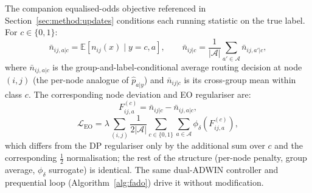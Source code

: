 \documentclass[sigconf,anonymous,review]{acmart}
\begin{document}
The companion equalised-odds objective referenced in Section~\ref{sec:method:updates} conditions each running statistic on the true label. For $c \in \{0,1\}$:
\[
\bar{n}_{ij,a|c} = \mathbb{E}[n_{ij}(x) \mid y=c, a], \qquad
\bar{n}_{ij|c} = \frac{1}{|\mathcal{A}|}\sum_{a' \in \mathcal{A}} \bar{n}_{ij,a'|c},
\]
where $\bar{n}_{ij,a|c}$ is the group-and-label-conditional average routing decision at node $(i,j)$ (the per-node analogue of $\hat{p}_{a|y}$) and $\bar{n}_{ij|c}$ is its
cross-group mean within class $c$. The corresponding node deviation and EO regulariser are:
\[
F_{ij,a}^{(c)} = \bar{n}_{ij|c} - \bar{n}_{ij,a|c},
\]
\[
\mathcal{L}_{\text{EO}} = \lambda \sum_{(i,j)} \frac{1}{2|\mathcal{A}|}\sum_{c \in \{0,1\}}\sum_{a \in \mathcal{A}} \phi_{\delta}\!\left(F_{ij,a}^{(c)}\right),
\]
which differs from the DP regulariser only by the additional sum over $c$ and the corresponding $\tfrac{1}{2}$ normalisation; the rest of the structure (per-node penalty,
group average, $\phi_\delta$ surrogate) is identical. The same dual-ADWIN controller and prequential loop (Algorithm~\ref{alg:fado}) drive it without modification.
\end{document}
